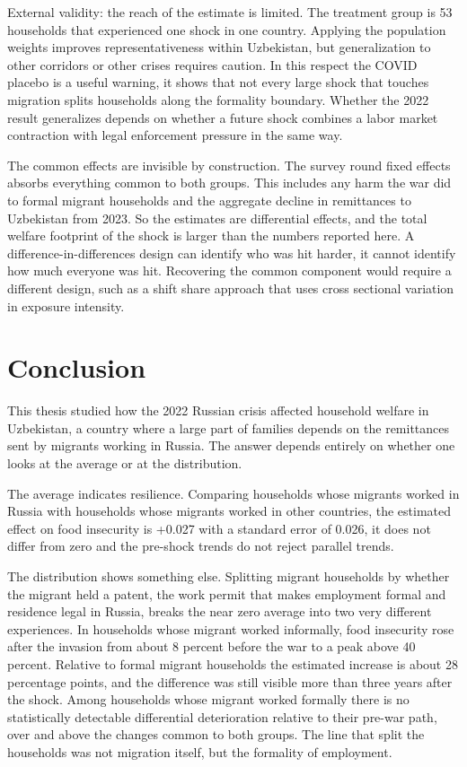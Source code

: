 External validity: the reach of the estimate is limited. The treatment group is 53 households that experienced one shock in one country. Applying the population weights improves representativeness within Uzbekistan, but generalization to other corridors or other crises requires caution. In this respect the COVID placebo is a useful warning, it shows that not every large shock that touches migration splits households along the formality boundary. Whether the 2022 result generalizes depends on whether a future shock combines a labor market contraction with legal enforcement pressure in the same way.

The common effects are invisible by construction. The survey round fixed effects absorbs everything common to both groups. This includes any harm the war did to formal migrant households and the aggregate decline in remittances to Uzbekistan from 2023. So the estimates are differential effects, and the total welfare footprint of the shock is larger than the numbers reported here. A difference-in-differences design can identify who was hit harder, it cannot identify how much everyone was hit. Recovering the common component would require a different design, such as a shift share approach that uses cross sectional variation in exposure intensity.

\section{Conclusion}\label{sec:10}

This thesis studied how the 2022 Russian crisis affected household welfare in Uzbekistan, a country where a large part of families depends on the remittances sent by migrants working in Russia. The answer depends entirely on whether one looks at the average or at the distribution.

The average indicates resilience. Comparing households whose migrants worked in Russia with households whose migrants worked in other countries, the estimated effect on food insecurity is +0.027 with a standard error of 0.026, it does not differ from zero and the pre-shock trends do not reject parallel trends. 

The distribution shows something else. Splitting migrant households by whether the migrant held a patent, the work permit that makes employment formal and residence legal in Russia, breaks the near zero average into two very different experiences. In households whose migrant worked informally, food insecurity rose after the invasion from about 8 percent before the war to a peak above 40 percent. Relative to formal migrant households the estimated increase is about 28 percentage points, and the difference was still visible more than three years after the shock. Among households whose migrant worked formally there is no statistically detectable differential deterioration relative to their pre-war path, over and above the changes common to both groups. The line that split the households was not migration itself, but the formality of employment.


